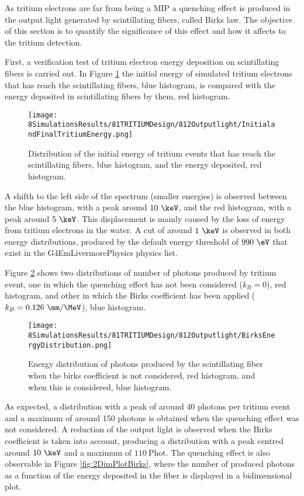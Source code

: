 As tritium electrons are far from being a MIP a quenching effect is produced in the output light generated by scintillating fibers, called Birks law. The objective of this section is to quantify the significance of this effect and how it affects to the tritium detection.

First, a verification test of tritium electron energy deposition on scintillating fibers is carried out. In Figure \ref{fig:InitialFinalTritiumEnergy} the initial energy of simulated tritium electrons that has reach the scintillating fibers, blue histogram, is compared with the energy deposited in scintillating fibers by them, red histogram.

\begin{figure}[h]
\centering
\texttt{[image: 8SimulationsResults/81TRITIUMDesign/812Outputlight/InitialandFinalTritiumEnergy.png]}
\caption{Distribution of the initial energy of tritium events that has reach the scintillating fibers, blue histogram, and the energy deposited, red histogram.\label{fig:InitialFinalTritiumEnergy}}
\end{figure}

A shifth to the left side of the spectrum (smaller energies) is observed between the blue histogram, with a peak around $10~\keV$, and the red histogram, with a peak around $5~\keV$. This displacement is mainly caused by the loss of energy from tritium electrons in the water. A cut of around $1~\keV$ is observed in both energy distributions, produced by the default energy threshold of $990~\eV$ that exist in the G4EmLivermorePhysics physics list.

Figure \ref{fig:BirksEffectinEnergyDistribution} shows two distributions of number of photons produced by tritium event, one in which the quenching effect has not been considered ($k_B=0$), red histogram, and other in which the Birks coefficient has been applied ($k_B=0.126~\mm/\MeV$), blue histogram.

\begin{figure}[h]
\centering
\texttt{[image: 8SimulationsResults/81TRITIUMDesign/812Outputlight/BirksEnergyDistribution.png]}
\caption{Energy distribution of photons produced by the scintillating fiber when the birks coefficient is not considered, red histogram, and when this is considered, blue histogram.\label{fig:BirksEffectinEnergyDistribution}}
\end{figure}  

As expected, a distribution with a peak of around 40 photons per tritium event and a maximum of around 150 photons is obtained when the quenching effect was not considered. A reduction of the output light is observed when the Birks coefficient is taken into account, producing a distribution with a peak centred around $10~\keV$ and a maximum of $110~\text{Phot}$. The quenching effect is also observable in Figure \ref{fig:2DimPlotBirks}, where the number of produced photons as a function of the energy deposited in the fiber is displayed in a bidimensional plot.

